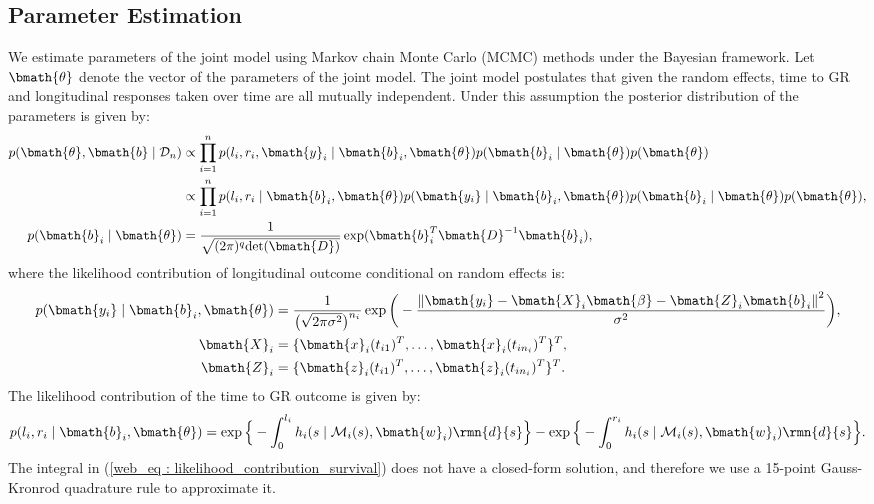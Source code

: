 \subsection{Parameter Estimation}
We estimate parameters of the joint model using Markov chain Monte Carlo (MCMC) methods under the Bayesian framework. Let $\bmath{\theta}$ denote the vector of the parameters of the joint model. The joint model postulates that given the random effects, time to GR and longitudinal responses taken over time are all mutually independent. Under this assumption the posterior distribution of the parameters is given by:
\begin{align*}
p(\bmath{\theta}, \bmath{b} \mid \mathcal{D}_n) & \propto \prod_{i=1}^n p(l_i, r_i, \bmath{y}_i \mid \bmath{b}_i, \bmath{\theta}) p(\bmath{b}_i \mid \bmath{\theta}) p(\bmath{\theta})\\
& \propto \prod_{i=1}^n p(l_i, r_i \mid \bmath{b}_i, \bmath{\theta}) p(\bmath{y_i} \mid \bmath{b}_i, \bmath{\theta}) p(\bmath{b}_i \mid \bmath{\theta}) p(\bmath{\theta}),\\
p(\bmath{b}_i \mid \bmath{\theta}) &= \frac{1}{\sqrt{(2 \pi)^q \text{det}(\bmath{D})}} \exp(\bmath{b}_i^T \bmath{D}^{-1} \bmath{b}_i),
\end{align*}
where the likelihood contribution of longitudinal outcome conditional on random effects is:
\begin{align*}
p(\bmath{y_i} \mid \bmath{b}_i, \bmath{\theta}) &= \frac{1}{\big(\sqrt{2 \pi \sigma^2}\big)^{n_i}} \exp\bigg(-\frac{{\lVert{\bmath{y_i} - \bmath{X}_i\bmath{\beta} - \bmath{Z}_i\bmath{b}_i}\rVert}^2}{\sigma^2}\bigg),\\
\bmath{X}_i &= \{\bmath{x}_i(t_{i1})^T, \ldots, \bmath{x}_i(t_{in_i})^T\}^T,\\
\bmath{Z}_i &= \{\bmath{z}_i(t_{i1})^T, \ldots, \bmath{z}_i(t_{in_i})^T\}^T.
\end{align*}
The likelihood contribution of the time to GR outcome is given by:
\begin{equation}
\label{web_eq : likelihood_contribution_survival}
p(l_i,r_i\mid \bmath{b}_i,\bmath{\theta}) = \exp\Big\{-\int_0^{l_i} h_i(s \mid \mathcal{M}_i(s), \bmath{w}_i)\rmn{d}{s}\Big\} - \exp\Big\{-\int_0^{r_i}h_i(s \mid \mathcal{M}_i(s), \bmath{w}_i)\rmn{d}{s}\Big\}.
\end{equation}
The integral in (\ref{web_eq : likelihood_contribution_survival}) does not have a closed-form solution, and therefore we use a 15-point Gauss-Kronrod quadrature rule to approximate it.

